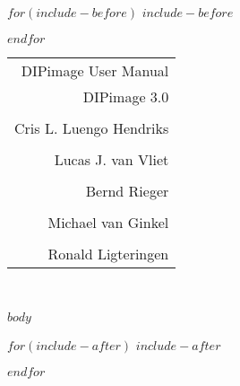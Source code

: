 \documentclass[11pt,twoside]{report}
\begin{document}
$for(include-before)$
$include-before$

$endfor$

\pagestyle{empty}
\hfill
\begin{tabular}{r}
  {\sffamily\Huge DIPimage User Manual} \\
  {\sffamily\Large DIPimage 3.0} \\
  \vspace{1cm} \\
  {\sffamily\LARGE Cris L. Luengo Hendriks} \\
  \vspace{-6pt} \\
  {\sffamily\LARGE Lucas J. van Vliet} \\
  \vspace{-6pt} \\
  {\sffamily\LARGE Bernd Rieger} \\
  \vspace{-6pt} \\
  {\sffamily\LARGE Michael van Ginkel} \\
  \vspace{-6pt} \\
  {\sffamily\LARGE Ronald Ligteringen} \\
\end{tabular} \\
\vfill\pagebreak\cleardoublepage

\pagestyle{fancy}
\setcounter{tocdepth}{1}
\tableofcontents
\clearemptydoublepage

$body$

$for(include-after)$
$include-after$

$endfor$
\end{document}
